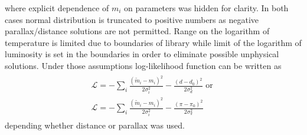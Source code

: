 \documentclass{pracalicmgr}
\begin{document}
where explicit dependence of $m_i$ on parameters was hidden for clarity. In both cases normal distribution is truncated to positive numbers as 
negative parallax/distance solutions are not permitted. Range on the logarithm of temperature is limited due to boundaries of library while limit of the logarithm of luminosity is 
set in the boundaries in order to eliminate possible unphysical solutions.
Under those assumptions log-likelihood function can be written as 
\begin{align}
    \begin{split}
    \mathcal{L}=-\sum_i\frac{(\tilde{m}_i-m_i)^2}{2\sigma_i^2}-\frac{(d-d_0)^2}{2\sigma_d^2} \textrm{ or }\\
    \mathcal{L}=-\sum_i\frac{(\tilde{m}_i-m_i)^2}{2\sigma_i^2}-\frac{(\pi-\pi_0)^2}{2\sigma_{\pi}^2}
    \end{split}
\end{align} depending whether distance or parallax was used. 
\end{document}
